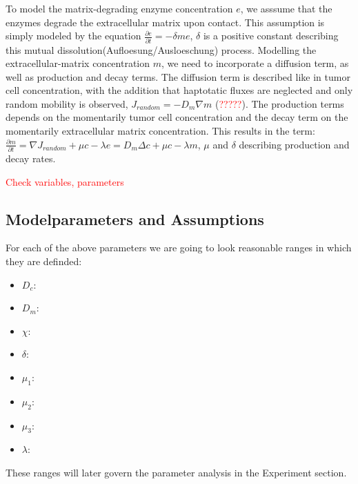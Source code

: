 To model the matrix-degrading enzyme concentration $e$, we asssume that the enzymes degrade the extracellular matrix upon contact. This assumption is simply modeled by the equation $\frac{\partial e}{\partial t} = -\delta m e$, $\delta$ is a positive constant describing this mutual dissolution(Aufloesung/Ausloeschung) process.\newline 
Modelling the extracellular-matrix concentration $m$, we need to incorporate a diffusion term, as well as production and decay terms. The diffusion term is described like in tumor cell concentration, with the addition that haptotatic fluxes are neglected and only random mobility is observed, $J_{random} = -D_m \nabla m$ (\textcolor{red}{?????}). The production terms depends on the momentarily tumor cell concentration and the decay term on the momentarily extracellular matrix concentration. This results in the term: $\frac{\partial m}{\partial t} = \nabla J_{random} + \mu c - \lambda e = D_m \Delta c + \mu c - \lambda m$, $\mu$ and $\delta$ describing production and decay rates.

\textcolor{red}{Check variables, parameters}

\subsection{Modelparameters and Assumptions}

For each of the above parameters we are going to look reasonable ranges in which they are definded:
\begin{itemize}
    \item $D_c$:
    \item $D_m$:
    \item $\chi$:
    \item $\delta$:
    \item $\mu_1$:
    \item $\mu_2$:
    \item $\mu_3$:
    \item $\lambda$:
\end{itemize}
These ranges will later govern the parameter analysis in the Experiment section.

